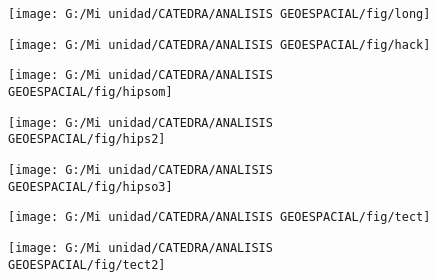\documentclass[14pt]{beamer}
\begin{document}
\begin{frame}
  \begin{figure}
    \centering
    \texttt{[image: G:/Mi unidad/CATEDRA/ANALISIS GEOESPACIAL/fig/long]}
  \end{figure}
\tiny{}
\end{frame}
\begin{frame}
  \begin{figure}
    \centering
    \texttt{[image: G:/Mi unidad/CATEDRA/ANALISIS GEOESPACIAL/fig/hack]}
  \end{figure}
\tiny{}
\end{frame}
\begin{frame}
  \begin{figure}
    \centering
    \texttt{[image: G:/Mi unidad/CATEDRA/ANALISIS GEOESPACIAL/fig/hipsom]}
  \end{figure}
\tiny{}
\end{frame}
\begin{frame}
  \begin{figure}
    \centering
    \texttt{[image: G:/Mi unidad/CATEDRA/ANALISIS GEOESPACIAL/fig/hips2]}
  \end{figure}
\tiny{}
\end{frame}
\begin{frame}
  \begin{figure}
    \centering
    \texttt{[image: G:/Mi unidad/CATEDRA/ANALISIS GEOESPACIAL/fig/hipso3]}
  \end{figure}
\tiny{}
\end{frame}
\begin{frame}
  \begin{figure}
    \centering
    \texttt{[image: G:/Mi unidad/CATEDRA/ANALISIS GEOESPACIAL/fig/tect]}
  \end{figure}
\tiny{}
\end{frame}
\begin{frame}
  \begin{figure}
    \centering
    \texttt{[image: G:/Mi unidad/CATEDRA/ANALISIS GEOESPACIAL/fig/tect2]}
  \end{figure}
\tiny{}
\end{frame}
\end{document}
